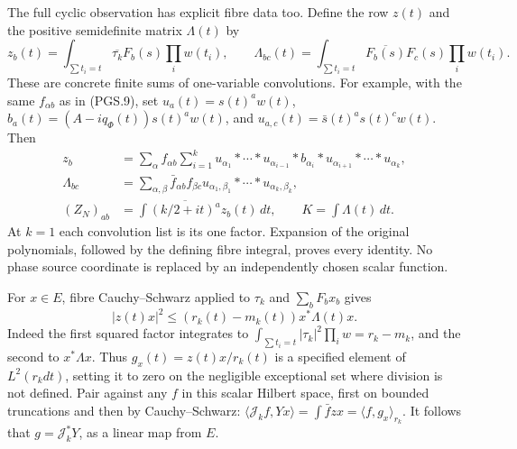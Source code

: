 The full cyclic observation has explicit fibre data too. Define
the row \(z(t)\) and the positive semidefinite matrix
\(\Lambda(t)\) by
\[
 z_b(t)=\int_{\sum t_i=t}\overline{\tau_k}F_b(s)\prod_iw(t_i),
 \qquad
 \Lambda_{bc}(t)=\int_{\sum t_i=t}\overline{F_b(s)}F_c(s)
                                                    \prod_iw(t_i).
\tag{PGS.37}\label{eq:pgs-fibre-data}
\]
These are concrete finite sums of one-variable convolutions.
For example, with the same \(f_{\alpha b}\) as in (PGS.9), set
\(u_a(t)=s(t)^aw(t)\),
\(b_a(t)=(A-iq_\Phi(t))s(t)^aw(t)\), and
\(u_{a,c}(t)=\bar s(t)^as(t)^cw(t)\). Then
\[
\begin{aligned}
 z_b&=\sum_{\alpha}f_{\alpha b}\sum_{i=1}^k
       u_{\alpha_1}*\cdots*u_{\alpha_{i-1}}*b_{\alpha_i}
               *u_{\alpha_{i+1}}*\cdots*u_{\alpha_k},\\
 \Lambda_{bc}&=\sum_{\alpha,\beta}\bar f_{\alpha b}f_{\beta c}
                u_{\alpha_1,\beta_1}*\cdots*u_{\alpha_k,\beta_k},\\
 (Z_N)_{ab}&=\int\overline{(k/2+it)^a}z_b(t)\,dt,\qquad
 K=\int\Lambda(t)\,dt.
\end{aligned}
\tag{PGS.38}\label{eq:pgs-cross-convolutions}
\]
At \(k=1\) each convolution list is its one factor. Expansion
of the original polynomials, followed by the defining fibre
integral, proves every identity. No phase source coordinate is
replaced by an independently chosen scalar function.

For \(x\in E\), fibre Cauchy--Schwarz applied to
\(\tau_k\) and \(\sum_bF_bx_b\) gives
\[
 |z(t)x|^2\le(r_k(t)-m_k(t))x^*\Lambda(t)x.
\tag{PGS.39}\label{eq:pgs-fibre-CS}
\]
Indeed the first squared factor integrates to
\(\int_{\sum t_i=t}|\tau_k|^2\prod_iw=r_k-m_k\),
and the second to \(x^*\Lambda x\). Thus
\(g_x(t)=z(t)x/r_k(t)\) is a specified element of \(L^2(r_kdt)\),
setting it to zero on the negligible exceptional set where division
is not defined. Pair against any \(f\) in this scalar Hilbert
space, first on bounded truncations and then by Cauchy--Schwarz:
\(\langle\mathscr J_kf,Yx\rangle=\int\bar f zx
=\langle f,g_x\rangle_{r_k}\). It follows that
\(g=\mathscr J_k^*Y\), as a linear map from \(E\).

